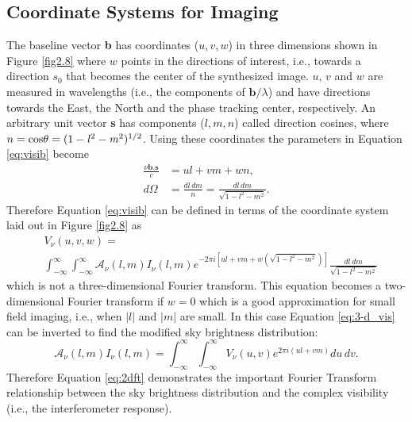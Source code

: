 \subsection{Coordinate Systems for Imaging}\label{subsec:7}
The baseline vector \textbf{b} has coordinates ($u,v,w$) in three dimensions shown in Figure \ref{fig2.8} where $w$ points in the directions of interest, i.e., towards a direction \textbf{$s_{0}$} that becomes the center of the synthesized image. $u$, $v$ and $w$ are measured in wavelengths (i.e., the components of $\textbf{b}/\lambda$) and have directions towards the East, the North and the phase tracking center, respectively. An arbitrary unit vector \textbf{s} has components ($l,m,n$) called direction cosines, where $n=\rm{cos}\theta=(1-\mathit{l}^2-\mathit{m}^2)^{1/2}$. Using these coordinates the parameters in Equation \ref{eq:visib} become
\begin{equation}
\begin{split}
\frac{\nu \textbf{b}.\textbf{s}}{c}&=ul+vm+wn, \\
d\Omega &= \frac{dl\,dm}{n}=\frac{dl\,dm}{\sqrt{1-l^2-m^2}}.
\end{split}
\end{equation}
Therefore Equation \ref{eq:visib} can be defined in terms of the coordinate system laid out in Figure \ref{fig2.8} as
\begin{equation}\label{eq:3-d_vis}
\begin{split}
&V_{\nu}(u,v,w)=\\
&\int ^{\infty}_{-\infty}\int ^{\infty}_{-\infty} \mathcal{A}_{\nu}(l,m)I_{\nu}(l,m)\mathit{e}^{-2\pi \mathit{i}[ul+vm+w(\sqrt{1-l^2-m^2})] }\frac{dl\,dm}{\sqrt{1-l^2-m^2}}
\end{split}
\end{equation}
which is not a three-dimensional Fourier transform. This equation becomes a two-dimensional Fourier transform if $w=0$ which is a good approximation for small field imaging, i.e., when $|l|$ and $|m|$ are small. In this case Equation \ref{eq:3-d_vis} can be inverted to find the modified sky brightness distribution:
\begin{equation}\label{eq:2dft}
\mathcal{A}_{\nu}(l,m)I_{\nu}(l,m)=\int ^{\infty}_{-\infty}\int ^{\infty}_{-\infty}V_{\nu}(u,v)\mathit{e}^{2\pi \mathit{i}(ul+vm)}du\,dv.
\end{equation}
Therefore Equation \ref{eq:2dft} demonstrates the important Fourier Transform relationship between the sky brightness distribution and the complex visibility (i.e., the interferometer response).

